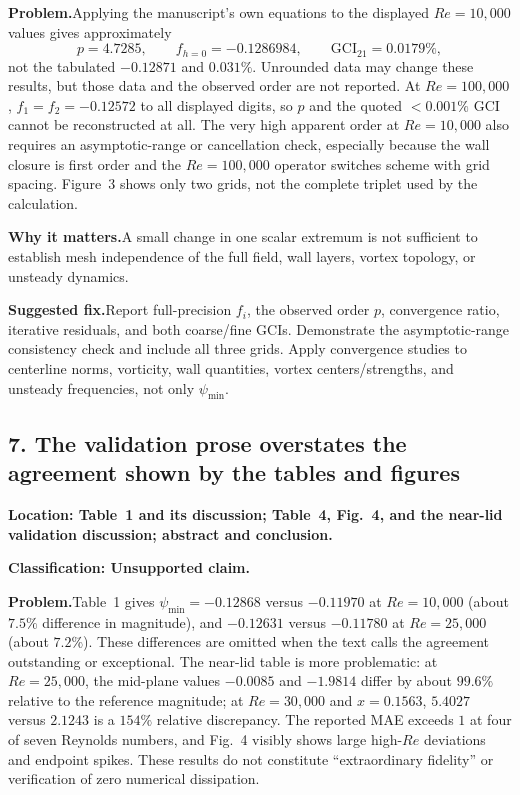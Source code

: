 \documentclass[11pt]{article}
\newcommand{\classification}[1]{\par\noindent\textbf{Classification: #1.}\par}
\newcommand{\location}[1]{\textbf{Location: #1}}
\newcommand{\problem}{\noindent\textbf{Problem.}\hspace{0.35em}}
\newcommand{\importance}{\par\noindent\textbf{Why it matters.}\hspace{0.35em}}
\newcommand{\fix}{\par\noindent\textbf{Suggested fix.}\hspace{0.35em}}
\begin{document}
\problem Applying the manuscript's own equations to the displayed $Re=10{,}000$ values gives approximately
\[
p=4.7285,\qquad f_{h=0}=-0.1286984,\qquad \mathrm{GCI}_{21}=0.0179\%,
\]
not the tabulated $-0.12871$ and $0.031\%$.  Unrounded data may change these results, but those data and the observed order are not reported.  At $Re=100{,}000$, $f_1=f_2=-0.12572$ to all displayed digits, so $p$ and the quoted ${<}0.001\%$ GCI cannot be reconstructed at all.  The very high apparent order at $Re=10{,}000$ also requires an asymptotic-range or cancellation check, especially because the wall closure is first order and the $Re=100{,}000$ operator switches scheme with grid spacing.  Figure~3 shows only two grids, not the complete triplet used by the calculation.

\importance A small change in one scalar extremum is not sufficient to establish mesh independence of the full field, wall layers, vortex topology, or unsteady dynamics.

\fix Report full-precision $f_i$, the observed order $p$, convergence ratio, iterative residuals, and both coarse/fine GCIs.  Demonstrate the asymptotic-range consistency check and include all three grids.  Apply convergence studies to centerline norms, vorticity, wall quantities, vortex centers/strengths, and unsteady frequencies, not only $\psi_{\min}$.

\subsection*{7. The validation prose overstates the agreement shown by the tables and figures}

\location{Table~1 and its discussion; Table~4, Fig.~4, and the near-lid validation discussion; abstract and conclusion.}

\classification{Unsupported claim}

\problem Table~1 gives $\psi_{\min}=-0.12868$ versus $-0.11970$ at $Re=10{,}000$ (about $7.5\%$ difference in magnitude), and $-0.12631$ versus $-0.11780$ at $Re=25{,}000$ (about $7.2\%$).  These differences are omitted when the text calls the agreement outstanding or exceptional.  The near-lid table is more problematic: at $Re=25{,}000$, the mid-plane values $-0.0085$ and $-1.9814$ differ by about $99.6\%$ relative to the reference magnitude; at $Re=30{,}000$ and $x=0.1563$, $5.4027$ versus $2.1243$ is a $154\%$ relative discrepancy.  The reported MAE exceeds $1$ at four of seven Reynolds numbers, and Fig.~4 visibly shows large high-$Re$ deviations and endpoint spikes.  These results do not constitute ``extraordinary fidelity'' or verification of zero numerical dissipation.
\end{document}
